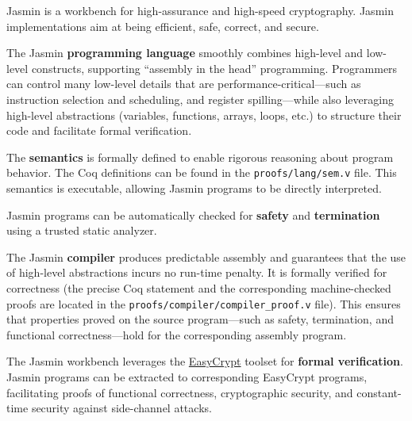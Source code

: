 Jasmin is a workbench for high-assurance and high-speed cryptography. Jasmin implementations aim at being efficient, safe, correct, and secure.

The Jasmin \textbf{programming language} smoothly combines high-level and low-level constructs, supporting ``assembly in the head'' programming. Programmers can control many low-level details that are performance-critical—such as instruction selection and scheduling, and register spilling—while also leveraging high-level abstractions (variables, functions, arrays, loops, etc.) to structure their code and facilitate formal verification.

The \textbf{semantics} is formally defined to enable rigorous reasoning about program behavior. The Coq definitions can be found in the \texttt{proofs/lang/sem.v} file. This semantics is executable, allowing Jasmin programs to be directly interpreted.

Jasmin programs can be automatically checked for \textbf{safety} and \textbf{termination} using a trusted 
static analyzer.

The Jasmin \textbf{compiler} produces predictable assembly and guarantees that the use of high-level abstractions incurs no run-time penalty. It is formally verified for correctness (the precise Coq statement and the corresponding machine-checked proofs are located in the \texttt{proofs/compiler/compiler\_proof.v} file). This ensures that properties proved on the source program—such as safety, termination, and functional correctness—hold for the corresponding assembly program.

The Jasmin workbench leverages the \href{https://www.easycrypt.info/}{EasyCrypt} toolset for \textbf{formal verification}. Jasmin programs can be 
extracted 
to corresponding EasyCrypt programs, facilitating proofs of functional correctness, cryptographic security, and constant-time security against side-channel attacks.